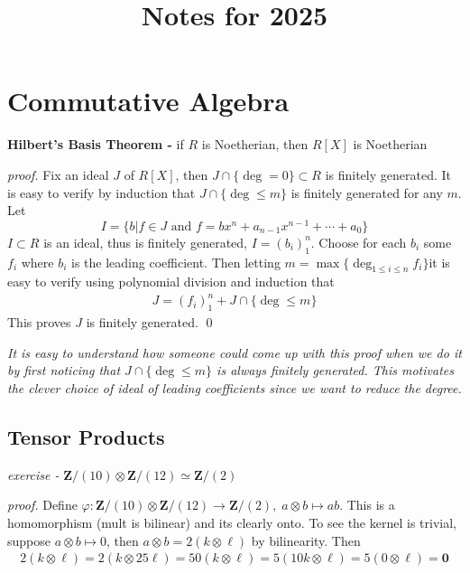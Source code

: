 \documentclass[11pt]{article}
\title{Notes for 2025}
\theoremstyle{definition}
\newcommand{\set}[1]{\{#1\}}
\newcommand{\tand}{\text{ and }}
\begin{document}
    \maketitle

    \section{Commutative Algebra}

    \textbf{Hilbert's Basis Theorem - } if \(R\) is Noetherian, then \(R[X]\) is Noetherian
    
    \emph{proof.} Fix an ideal \(J\) of \(R[X]\), then \(J \cap \set{\deg = 0} \subset R\) is finitely generated. It is easy to verify by induction that
    \(J \cap \set{\deg \leq m}\) is finitely generated for any \(m\). Let \[I = \set{b \vert f \in J \tand f = bx^n + a_{n-1}x^{n-1} + \cdots + a_0}\]
    \(I \subset R\) is an ideal, thus is finitely generated, \(I = (b_i)_1^n\). Choose for each \(b_i\) some \(f_i\) where \(b_i\) is the leading coefficient.
    Then letting \(m = \max\set{\deg_{1\leq i\leq n} f_i}\)it is easy to verify using polynomial division and induction that
    \begin{align*}
        J = (f_i)_1^n + J \cap \set{\deg \leq m}
    \end{align*}
    This proves \(J\) is finitely generated. \qed

    \emph{It is easy to understand how someone could come up with this proof when we do it by first noticing that \(J \cap \set{\deg \leq m}\) is always finitely generated.
    This motivates the clever choice of ideal of leading coefficients since we want to reduce the degree.}

    \subsection{Tensor Products}

    \emph{exercise - } \(\mathbf{Z}/(10)\otimes \mathbf{Z}/(12) \simeq \mathbf{Z}/(2)\)

    \emph{proof.} Define \(\varphi: \mathbf{Z}/(10)\otimes \mathbf{Z}/(12) \to \mathbf{Z}/(2), \; a\otimes b \mapsto ab\). This is a homomorphism (mult is bilinear) and its clearly onto.
    To see the kernel is trivial, suppose \(a \otimes b \mapsto 0\), then \(a \otimes b = 2 (k \otimes \ell)\) by bilinearity. Then
    \begin{align*}
        2 (k \otimes \ell) = 2 (k \otimes 25\ell) = 50 (k \otimes \ell) = 5 (10k \otimes \ell) = 5(0 \otimes \ell) = \mathbf{0}
    \end{align*}
\end{document}

